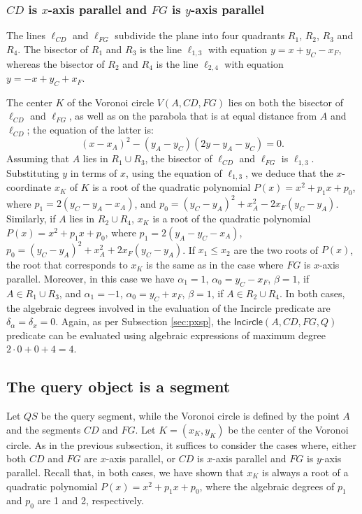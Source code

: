 \documentclass[letterpaper,11pt]{article}
\newcommand{\incircle}{\textsf{Incircle}\xspace}
\newcommand{\vor}{Voronoi\xspace}
\begin{document}
\subsubsection{$CD$ is $x$-axis parallel and $FG$ is $y$-axis parallel}
\label{sec:pssp-vertical}

The lines $\ell_{CD}$ and $\ell_{FG}$ subdivide the plane into
four quadrants $R_1$, $R_2$, $R_3$ and $R_4$.
The bisector of $R_1$ and $R_3$ is the line
$\ell_{1,3}$ with equation $y=x+y_C-x_F$, whereas the bisector of
$R_2$ and $R_4$ is the line $\ell_{2,4}$ with equation $y=-x+y_C+x_F$.

The center $K$ of the \vor circle $V(A,CD,FG)$ lies on both the
bisector of $\ell_{CD}$ and $\ell_{FG}$, as well as on the parabola
that is at equal distance from $A$ and $\ell_{CD}$; the equation of
the latter is:
\begin{equation}\label{equ:parabola-A-CD}
  (x-x_A)^2-(y_A-y_C)(2y-y_A-y_C)=0.
\end{equation}
Assuming that $A$ lies in $R_1\cup{}R_3$, the bisector of $\ell_{CD}$
and $\ell_{FG}$ is $\ell_{1,3}$. Substituting $y$ in terms of $x$,
using the equation of $\ell_{1,3}$, we deduce that the $x$-coordinate
$x_K$ of $K$ is a root of the quadratic polynomial
$P(x)=x^2+p_1x+p_0$, where
$p_1=2(y_C-y_A-x_A)$, and
$p_0=(y_C-y_A)^2+x_A^2-2x_F(y_C-y_A)$.
Similarly, if $A$ lies in $R_2\cup{}R_4$, $x_K$ is a root of the
quadratic polynomial $P(x)=x^2+p_1x+p_0$, where
$p_1=2(y_A-y_C-x_A)$,
$p_0=(y_C-y_A)^2+x_A^2+2x_F(y_C-y_A)$.
If $x_1\le{}x_2$ are the two roots of $P(x)$, the root that
corresponds to $x_K$ is the same as in the case where $FG$ is $x$-axis
parallel.
Moreover, in this case we have $\alpha_1=1$,
$\alpha_0=y_C-x_F$, $\beta=1$, if $A\in{}R_1\cup{}R_3$, and
$\alpha_1=-1$, $\alpha_0=y_C+x_F$, $\beta=1$, if
$A\in{}R_2\cup{}R_4$. In both cases, the algebraic degrees
involved in the evaluation of the \incircle predicate are
$\delta_\alpha=\delta_x=0$. Again, as per Subsection \ref{sec:pxsp},
the $\incircle(A,CD,FG,Q)$ predicate can be evaluated using algebraic
expressions of maximum degree $2\cdot{}0+0+4=4$.







\subsection{The query object is a segment}\label{sec:psss}

Let $QS$ be the query segment, while the \vor
circle is defined by the point $A$ and the segments $CD$ and $FG$. Let
$K=(x_K,y_K)$ be the center of the \vor circle. As in the previous
subsection, it suffices to consider the cases where, either both $CD$
and $FG$ are $x$-axis parallel, or $CD$ is $x$-axis parallel and $FG$
is $y$-axis parallel. Recall that, in both cases, we have shown that
$x_K$ is always a root of a quadratic polynomial $P(x)=x^2+p_1x+p_0$,
where the algebraic degrees of $p_1$ and $p_0$ are 1 and 2, respectively.
\end{document}
